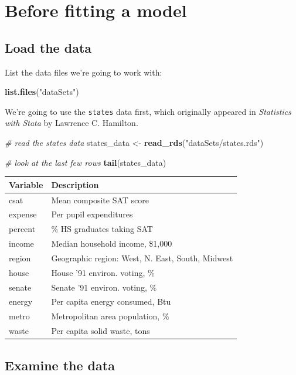 \documentclass[]{book}
\newenvironment{Shaded}{\begin{snugshade}}{\end{snugshade}}
\newcommand{\KeywordTok}[1]{\textcolor[rgb]{0.13,0.29,0.53}{\textbf{#1}}}
\newcommand{\StringTok}[1]{\textcolor[rgb]{0.31,0.60,0.02}{#1}}
\newcommand{\CommentTok}[1]{\textcolor[rgb]{0.56,0.35,0.01}{\textit{#1}}}
\newcommand{\NormalTok}[1]{#1}
\begin{document}
\section{Before fitting a model}\label{before-fitting-a-model}

\subsection{Load the data}\label{load-the-data}

List the data files we're going to work with:

\begin{Shaded}
\begin{Highlighting}[]
\KeywordTok{list.files}\NormalTok{(}\StringTok{"dataSets"}\NormalTok{)}
\end{Highlighting}
\end{Shaded}

We're going to use the \texttt{states} data first, which originally
appeared in \emph{Statistics with Stata} by Lawrence C. Hamilton.

\begin{Shaded}
\begin{Highlighting}[]
  \CommentTok{# read the states data}
\NormalTok{  states_data <-}\StringTok{ }\KeywordTok{read_rds}\NormalTok{(}\StringTok{"dataSets/states.rds"}\NormalTok{) }

  \CommentTok{# look at the last few rows}
  \KeywordTok{tail}\NormalTok{(states_data)}
\end{Highlighting}
\end{Shaded}

\begin{longtable}[]{@{}ll@{}}
\toprule
Variable & Description\tabularnewline
\midrule
\endhead
csat & Mean composite SAT score\tabularnewline
expense & Per pupil expenditures\tabularnewline
percent & \% HS graduates taking SAT\tabularnewline
income & Median household income, \$1,000\tabularnewline
region & Geographic region: West, N. East, South, Midwest\tabularnewline
house & House '91 environ. voting, \%\tabularnewline
senate & Senate '91 environ. voting, \%\tabularnewline
energy & Per capita energy consumed, Btu\tabularnewline
metro & Metropolitan area population, \%\tabularnewline
waste & Per capita solid waste, tons\tabularnewline
\bottomrule
\end{longtable}

\subsection{Examine the data}\label{examine-the-data}
\end{document}
